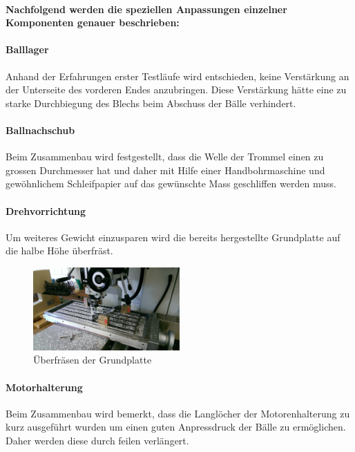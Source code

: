 \paragraph{Nachfolgend werden die speziellen Anpassungen einzelner Komponenten genauer beschrieben:}

\paragraph{Balllager}
Anhand der Erfahrungen erster Testläufe wird entschieden, keine Verstärkung an 
der Unterseite des vorderen Endes anzubringen. Diese Verstärkung hätte eine zu 
starke Durchbiegung des Blechs beim Abschuss der Bälle verhindert.

\paragraph{Ballnachschub}
Beim Zusammenbau wird festgestellt, dass die Welle der Trommel einen zu 
grossen Durchmesser hat und daher mit Hilfe einer Handbohrmaschine und 
gewöhnlichem Schleifpapier auf das gewünschte Mass geschliffen werden muss.

\paragraph{Drehvorrichtung}
Um weiteres Gewicht einzusparen wird die bereits hergestellte Grundplatte auf 
die halbe Höhe überfräst.

\begin{figure}[h!]
	\centering
	\includegraphics[width=0.5\textwidth]{fig/IMAG0357.jpg}
	\caption{Überfräsen der Grundplatte}
	\label{fig:Grundplatte fräsen}
\end{figure}
\FloatBarrier

\paragraph{Motorhalterung}
Beim Zusammenbau wird bemerkt, dass die Langlöcher der Motorenhalterung zu 
kurz ausgeführt wurden um einen guten Anpressdruck der Bälle zu ermöglichen. 
Daher werden diese durch feilen verlängert.

